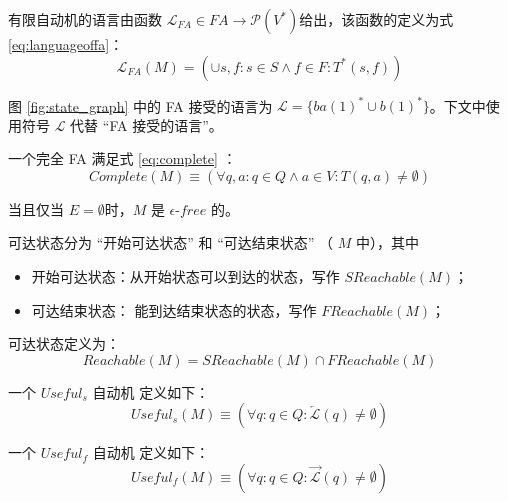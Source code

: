 \begin{definition}
    有限自动机的语言由函数 $\mathcal{L}_{FA} \in FA \longrightarrow \mathcal{P}(V^*) $给出，该函数的定义为式 \ref{eq:languageoffa}： 
    \begin{equation}\label{eq:languageoffa}
        \mathcal{L}_{FA} (M) = (\cup s,f:s \in S \land f \in F : T^* (s,f))
    \end{equation}
\end{definition}

\begin{example}[FA 的语言]
    图 \ref{fig:state_graph} 中的 FA 接受的语言为 $ \mathcal{L}= \{ ba(1)^*\cup b(1)^* \}$。下文中使用符号 $\mathcal{L}$ 代替 “FA 接受的语言”。
\end{example}

\begin{definition}[完全 FA ($Complete$)]
    一个完全 FA 满足式 \ref{eq:complete} ：
    \begin{equation} \label{eq:complete}
        Complete(M) \equiv ( \forall q,a:q\in Q \land a \in V : T(q,a) \not= \emptyset ) 
    \end{equation}
\end{definition}

\begin{definition}
    当且仅当 $E=\emptyset$时，$M$ 是 $\epsilon$-$free$ 的。
\end{definition}

\begin{definition}
    可达状态分为 “开始可达状态” 和 “可达结束状态” （ $M$ 中），其中
    \begin{itemize}
        \item 开始可达状态：从开始状态可以到达的状态，写作 $SReachable(M)$；
        \item 可达结束状态： 能到达结束状态的状态，写作 $FReachable(M)$；
    \end{itemize}
    可达状态定义为：
    \[ Reachable(M) = SReachable(M) \cap FReachable(M) \]
\end{definition}

\begin{definition}
    一个 $Useful_s$ 自动机 定义如下： 
    \[ Useful_s (M) \equiv ( \forall q:q \in Q : \overleftarrow{\mathcal{L}} (q) \not= \emptyset ) \]
\end{definition}

\begin{definition}
    一个 $Useful_f$ 自动机 定义如下： 
    \[ Useful_f (M) \equiv ( \forall q:q \in Q : \overrightarrow{\mathcal{L}} (q) \not= \emptyset ) \]
\end{definition}

